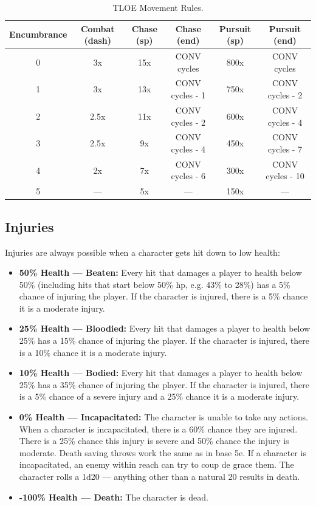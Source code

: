 \documentclass[letterpaper,12pt]{article}
\begin{document}
\begin{table}[ht]
\begin{center}
\caption{TLOE Movement Rules.}
\label{tbl:bins} %
\begin{tabular}{|c|c|cc|cc|} 
\hline
\multicolumn{1}{|c|}{Encumbrance} & \multicolumn{0}{|c|}{Combat (dash)} & \multicolumn{0}{|c}{Chase (sp)} & \multicolumn{0}{c|}{Chase (end)} & \multicolumn{0}{|c}{Pursuit (sp)} & \multicolumn{1}{c|}{Pursuit (end)} \\
\hline
0 &   3x &   15x &   CONV cycles &   800x &   CONV cycles \\
1 &   3x &   13x &   CONV cycles - 1 &   750x &   CONV cycles - 2\\
2 &   2.5x &   11x &   CONV cycles - 2 &   600x &   CONV cycles - 4\\
3 &   2.5x &   9x &   CONV cycles - 4 &   450x &   CONV cycles - 7\\
4 &   2x &   7x &   CONV cycles - 6 &  300x  &   CONV cycles - 10\\
5 &   --- &   5x &   --- &   150x &   --- \\
\hline
\end{tabular}
\end{center}
\end{table}



\subsection{Injuries}
 
Injuries are always possible when a character gets hit down to low health:

\begin{itemize}
\item \textbf{50\% Health --- Beaten:} Every hit that damages a player to health below 50\% (including hits that start below 50\% hp, e.g. 43\% to 28\%) has a 5\% chance of injuring the player. If the character is injured, there is a 5\% chance it is a moderate injury. 
\item \textbf{25\% Health --- Bloodied:} Every hit that damages a player to health below 25\% has a 15\% chance of injuring the player. If the character is injured, there is a 10\% chance it is a moderate injury. 
\item \textbf{10\% Health --- Bodied:} Every hit that damages a player to health below 25\% has a 35\% chance of injuring the player. If the character is injured, there is a 5\% chance of a severe injury and a 25\% chance it is a moderate injury. 
\item \textbf{0\% Health --- Incapacitated:} The character is unable to take any actions. When a character is incapacitated, there is a 60\% chance they are injured. There is a 25\% chance this injury is severe and 50\% chance the injury is moderate. Death saving throws work the same as in base 5e. If a character is incapacitated, an enemy within reach can try to coup de grace them. The character rolls a 1d20 --- anything other than a natural 20 results in death.
\item \textbf{-100\% Health --- Death:} The character is dead. 
\end{itemize}  
\end{document}

